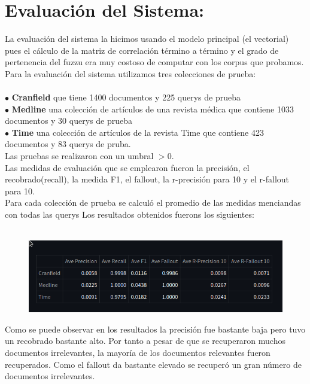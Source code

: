 \documentclass{llncs}
\begin{document}
\chapter*{Evaluación del Sistema:}

La evaluación del sistema la hicimos usando el modelo principal (el vectorial) pues el cálculo 
de la matriz de correlación término a término y el grado de pertenencia del fuzzu era muy 
costoso de computar con los corpus que probamos.\\

\noindent
Para la evaluación del sistema utilizamos tres colecciones de prueba:\\\\

\noindent
$\bullet$ \textbf{Cranfield} que tiene 1400 documentos y 225 querys de prueba\\
$\bullet$ \textbf{Medline} una colección de artículos de una revista médica que contiene 1033 documentos y 30 querys de prueba\\ 
$\bullet$ \textbf{Time} una colección de artículos de la revista Time que contiene 423 documentos y 83 querys de pruba.\\

\noindent
Las pruebas se realizaron con un umbral $> 0$.\\
Las medidas de evaluación que se emplearon fueron la precisión, el recobrado(recall), la medida F1,
el fallout, la r-precisión para 10 y el r-fallout para 10.\\
Para cada colección de prueba se calculó el promedio de las medidas menciandas con todas las querys
Los resultados obtenidos fuerons los siguientes:\\\

\begin{figure}
    \includegraphics[scale = .7]{./images/umbrarl_ma0.png}
\end{figure}


Como se puede observar en los resultados la precisión fue bastante baja pero tuvo un recobrado bastante
alto. Por tanto a pesar de que se recuperaron muchos documentos irrelevantes, la mayoría de los documentos 
relevantes fueron recuperados. Como el fallout da bastante elevado se recuperó un gran número de documentos 
irrelevantes.
\end{document}
